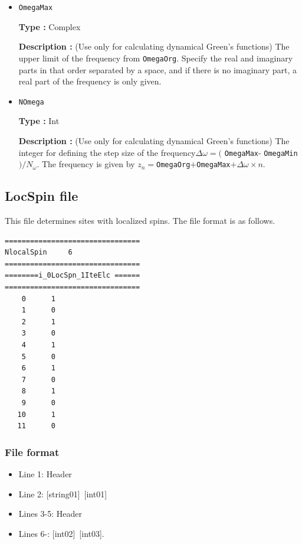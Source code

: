 \begin{itemize}
    {\bf Type :} Complex
    
    {\bf Description :} (Use only for calculating dynamical Green's functions) 
    The lower limit of the frequency from \verb|OmegaOrg|. 
    Specify the real and imaginary parts in that order separated by a space, and if there is no imaginary part, the real part of the frequency is only given.
    
  \item \verb|OmegaMax|

    {\bf Type :} Complex
    
    {\bf Description :} (Use only for calculating dynamical Green's functions) 
    The upper limit of the frequency from \verb|OmegaOrg|.
    Specify the real and imaginary parts in that order separated by a space, and if there is no imaginary part, a real part of the frequency is only given.
  
\item \verb|NOmega|

{\bf Type :} Int

{\bf Description :} {(Use only for calculating dynamical Green's functions) 
 The integer for defining the step size of the frequency$\Delta \omega = ($ \verb|OmegaMax|- \verb|OmegaMin|$)/N_{\omega}$. The frequency is given by $z_n=$\verb|OmegaOrg|$+$\verb|OmegaMax|$+ \Delta \omega \times n$.} 
 
 \end{itemize}


\newpage
\subsection{LocSpin file}
\label{Subsec:locspn}
This file determines sites with localized spins. The file format is as follows.\\
\begin{minipage}{10cm}
\begin{screen}
\begin{verbatim}
================================ 
NlocalSpin     6  
================================ 
========i_0LocSpn_1IteElc ====== 
================================ 
    0      1
    1      0
    2      1
    3      0
    4      1
    5      0
    6      1
    7      0
    8      1
    9      0
   10      1
   11      0
\end{verbatim}
\end{screen}
\end{minipage}


\subsubsection{File format}
\begin{itemize}
   \item  Line 1:  Header
   \item  Line 2:   [string01]~[int01]
   \item  Lines 3-5:  Header
   \item  Lines 6-:  [int02]~[int03].
  \end{itemize}
